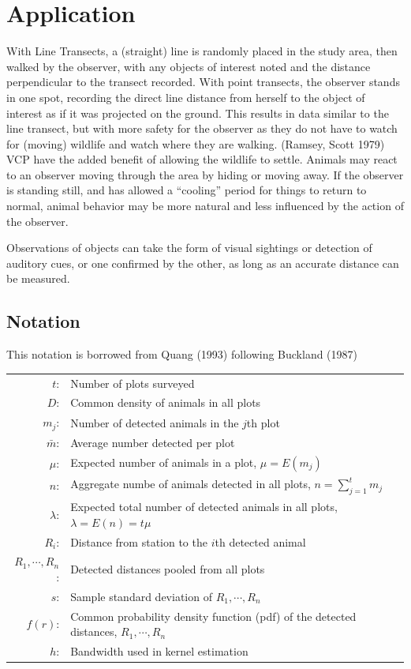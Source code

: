 \documentclass[12pt]{article}
\begin{document}
\section{Application}
With Line Transects, a (straight) line is randomly placed in the study area, then walked by the observer, with any objects of interest noted and the distance perpendicular to the transect recorded. With point transects, the observer stands in one spot, recording the direct line distance from herself to the object of interest as if it was projected on the ground. This results in data similar to the line transect, but with more safety for the observer as they do not have to watch for (moving) wildlife and watch where they are walking. (Ramsey, Scott 1979) VCP have the added benefit of allowing the wildlife to settle. Animals may react to an observer moving through the area by hiding or moving away. If the observer is standing still, and has allowed a ``cooling'' period for things to return to normal, animal behavior may be more natural and less influenced by the action of the observer.

Observations of objects can take the form of visual sightings or detection of auditory cues, or one confirmed by the other, as long as an accurate distance can be measured.

\subsection{Notation}
This notation is borrowed from Quang (1993) following Buckland (1987)

\begin{tabular}{r l}
$t$:	&	Number of plots surveyed\\
$D$:	& Common density of animals in all plots\\
$m_j$:	& Number of detected animals in the $j$th plot\\
$\bar m$:	& Average number detected per plot\\
$\mu$:	& Expected number of animals in a plot, $\mu = E(m_j)$\\
$n$:	& Aggregate numbe of animals detected in all plots, $n=\sum_{j=1}^t m_j$\\
$\lambda$:	&	Expected total number of detected animals in all plots, $\lambda=E(n)=t\mu$\\
$R_i$:	& Distance from station to the $i$th detected animal\\
$R_1,\cdots,R_n$: & Detected distances pooled from all plots\\
$s$:	& Sample standard deviation of $R_1,\cdots,R_n$\\
$f(r)$: & Common probability density function (pdf) of the detected distances, $R_1,\cdots,R_n$\\
$h$: 	& Bandwidth used in kernel estimation
\end{tabular}\\
\end{document}
